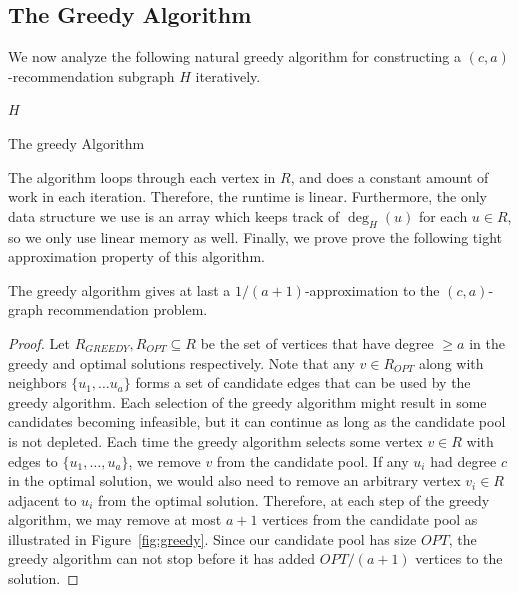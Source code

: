\subsection{The Greedy Algorithm}
\label{greedy}

We now analyze the following natural greedy algorithm for constructing a $(c,a)$-recommendation
subgraph $H$ iteratively. \vspace{0.05in}

\begin{algorithm}[h]
  \SetAlgoLined
  \Return $H$\;
  \caption{The greedy Algorithm}
\end{algorithm}\vs

The algorithm loops through each vertex in $R$, and does a constant amount
of work in each iteration. Therefore, the runtime is linear. Furthermore,
the only data structure we use is an array which keeps track of $\deg_H(u)$
for each $u\in R$, so we only use linear memory as well. Finally, we prove
prove the following tight approximation property of this algorithm.

\begin{thm}
The greedy algorithm gives at last a $1/(a+1)$-approximation to the $(c,a)$-graph
recommendation problem.
\end{thm}
\begin{proof}
Let $R_{GREEDY}, R_{OPT}\subseteq R$ be the set of vertices that have
degree $\geq a$ in the greedy and optimal solutions respectively. Note
that any $v \in R_{OPT}$ along with neighbors $\{u_1,\ldots u_a\}$
forms a set of candidate edges that can be used by the greedy
algorithm.
Each selection of the greedy algorithm might result in
some candidates becoming infeasible, but it can continue as long as the candidate pool is not depleted.
Each time the greedy algorithm selects some vertex $v\in
R$ with edges to $\{u_1,\ldots, u_a\}$, we remove $v$ from the candidate pool.
If any $u_i$ had degree $c$ in the optimal solution, we would also need to
remove an arbitrary vertex $v_i\in R$ adjacent to $u_i$ from the optimal
solution.
Therefore, at each step of
the greedy algorithm, we may remove at most $a+1$ vertices from
the candidate pool as illustrated in Figure~\ref{fig:greedy}. Since our candidate pool has size $OPT$, the
greedy algorithm can not stop before it has added $OPT/(a+1)$
vertices to the solution.
\end{proof}

